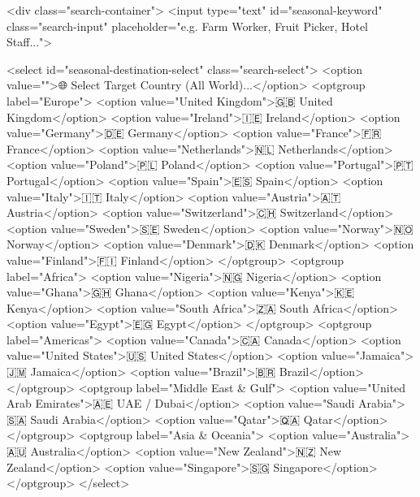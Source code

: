             <div class="search-container">
                <input type="text" id="seasonal-keyword" class="search-input"
                    placeholder="e.g. Farm Worker, Fruit Picker, Hotel Staff...">

                <select id="seasonal-destination-select" class="search-select">
                    <option value="">🌐 Select Target Country (All World)...</option>
                    <optgroup label="Europe">
                        <option value="United Kingdom">🇬🇧 United Kingdom</option>
                        <option value="Ireland">🇮🇪 Ireland</option>
                        <option value="Germany">🇩🇪 Germany</option>
                        <option value="France">🇫🇷 France</option>
                        <option value="Netherlands">🇳🇱 Netherlands</option>
                        <option value="Poland">🇵🇱 Poland</option>
                        <option value="Portugal">🇵🇹 Portugal</option>
                        <option value="Spain">🇪🇸 Spain</option>
                        <option value="Italy">🇮🇹 Italy</option>
                        <option value="Austria">🇦🇹 Austria</option>
                        <option value="Switzerland">🇨🇭 Switzerland</option>
                        <option value="Sweden">🇸🇪 Sweden</option>
                        <option value="Norway">🇳🇴 Norway</option>
                        <option value="Denmark">🇩🇰 Denmark</option>
                        <option value="Finland">🇫🇮 Finland</option>
                    </optgroup>
                    <optgroup label="Africa">
                        <option value="Nigeria">🇳🇬 Nigeria</option>
                        <option value="Ghana">🇬🇭 Ghana</option>
                        <option value="Kenya">🇰🇪 Kenya</option>
                        <option value="South Africa">🇿🇦 South Africa</option>
                        <option value="Egypt">🇪🇬 Egypt</option>
                    </optgroup>
                    <optgroup label="Americas">
                        <option value="Canada">🇨🇦 Canada</option>
                        <option value="United States">🇺🇸 United States</option>
                        <option value="Jamaica">🇯🇲 Jamaica</option>
                        <option value="Brazil">🇧🇷 Brazil</option>
                    </optgroup>
                    <optgroup label="Middle East & Gulf">
                        <option value="United Arab Emirates">🇦🇪 UAE / Dubai</option>
                        <option value="Saudi Arabia">🇸🇦 Saudi Arabia</option>
                        <option value="Qatar">🇶🇦 Qatar</option>
                    </optgroup>
                    <optgroup label="Asia & Oceania">
                        <option value="Australia">🇦🇺 Australia</option>
                        <option value="New Zealand">🇳🇿 New Zealand</option>
                        <option value="Singapore">🇸🇬 Singapore</option>
                    </optgroup>
                </select>

